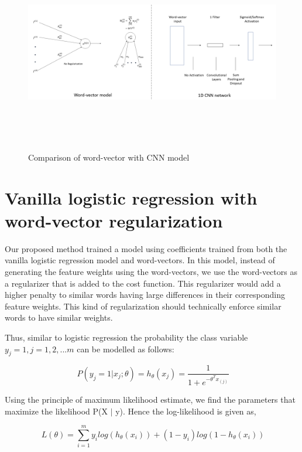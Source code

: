 \begin{figure}[htbp]
\centering
\includegraphics[width=16cm, height=8cm]{images/wv-cnn.png}\\
\centering
\caption{Comparison of word-vector with CNN model}
\label{fig:foo}
\end{figure}

\newpage
\section{Vanilla logistic regression with word-vector regularization}

Our proposed method trained a model using coefficients trained from both the vanilla logistic regression model and word-vectors. In this model, instead of generating the feature weights using the word-vectors, we use the word-vectors as a regularizer that is added to the cost function. This regularizer would add a higher penalty to similar words having large differences in their corresponding feature weights. This kind of regularization should technically enforce similar words to have similar weights.

Thus, similar to logistic regression the probability the class variable $y_{j}=1, j=1,2,...m$ can be modelled as follows:

\begin{equation}
\ P(y_{j}  = 1 | x_{j}; \theta) = h_{\theta}(x_{j}) = \frac{1}{1+e^{-\theta^{T}x_{(j)}}}
\end{equation}

Using the principle of maximum likelihood estimate, we find the parameters that maximize the likelihood P(X $|$ y). Hence the log-likelihood is given as,

\begin{equation}
\ L(\theta) = \sum_{i=1}^{m}{y_{i}log(h_{\theta}(x_{i})) + (1-y_{i})log(1-h_{\theta}(x_{i}))}
\end{equation}

